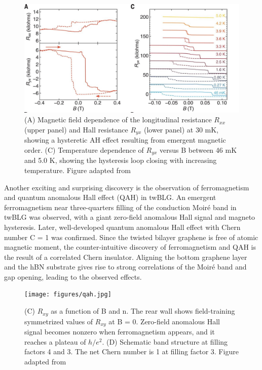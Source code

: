 \begin{figure}[H]
	\centering
	\includegraphics[width=\textwidth]{figures/ferro.jpg}
	\caption{(A) Magnetic field dependence of the longitudinal resistance $R_{xx}$ (upper panel) and Hall resistance $R_{yx}$ (lower panel) at 30 mK, showing a hysteretic AH effect resulting from emergent magnetic order. (C) Temperature dependence of $R_{yx}$ versus B between 46 mK and 5.0 K, showing the hysteresis loop closing with increasing temperature. Figure adapted from \cite{Sharpe605}}
	\label{fig:ferro}
\end{figure}

Another exciting and surprising discovery is the observation of ferromagnetism and quantum anomalous Hall effect (QAH) in twBLG. An emergent ferromagnetism near three-quarters filling of
the conduction Moiré band in twBLG was observed, with a giant zero-field
anomalous Hall signal and magneto hysteresis. \cite{Sharpe605} Later, well-developed quantum anomalous Hall effect with Chern number
C = 1 was confirmed. \cite{Serlin900} Since the twisted bilayer graphene is free of atomic magnetic moment, the counter-intuitive discovery of ferromagnetism \cite{Sharpe605} and
QAH \cite{Serlin900} is the result of a correlated Chern insulator. Aligning the bottom graphene layer and the hBN substrate gives rise to strong correlations of the Moiré band and gap opening, leading to the observed effects.

\begin{figure}[H]
	\centering
	\texttt{[image: figures/qah.jpg]}
	\caption{(C) $R_{xy}$ as a function of B and n. The rear wall shows field-training symmetrized values of $R_{xy}$ at B = 0. Zero-field anomalous Hall signal becomes nonzero when ferromagnetism appears, and it reaches a plateau of $h/e^2$. (D) Schematic band structure at filling factors 4 and 3. The net Chern number is 1 at filling factor 3. Figure adapted from \cite{Serlin900}}
	\label{fig:qah}
\end{figure}

